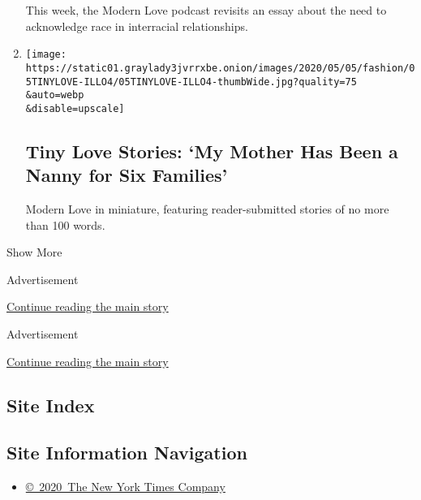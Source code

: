 \begin{enumerate}
  This week, the Modern Love podcast revisits an essay about the need to
  acknowledge race in interracial relationships.
\item
  \href{/2020/06/09/style/tiny-modern-love-stories-coronavirus-nanny-for-six-families.html}{}

  \texttt{[image: https://static01.graylady3jvrrxbe.onion/images/2020/05/05/fashion/05TINYLOVE-ILLO4/05TINYLOVE-ILLO4-thumbWide.jpg?quality=75\\\&auto=webp\\\&disable=upscale]}

  \hypertarget{tiny-love-stories-my-mother-has-been-a-nanny-for-six-families}{%
  \subsection{Tiny Love Stories: `My Mother Has Been a Nanny for Six
  Families'}\label{tiny-love-stories-my-mother-has-been-a-nanny-for-six-families}}

  Modern Love in miniature, featuring reader-submitted stories of no
  more than 100 words.
\end{enumerate}

Show More

Advertisement

\protect\hyperlink{after-mid2}{Continue reading the main story}

Advertisement

\protect\hyperlink{after-mktg}{Continue reading the main story}

\hypertarget{site-index}{%
\subsection{Site Index}\label{site-index}}

\hypertarget{site-information-navigation}{%
\subsection{Site Information
Navigation}\label{site-information-navigation}}

\begin{itemize}
\tightlist
\item
  \href{https://help.nytimes3xbfgragh.onion/hc/en-us/articles/115014792127-Copyright-notice}{©~2020~The
  New York Times Company}
\end{itemize}

